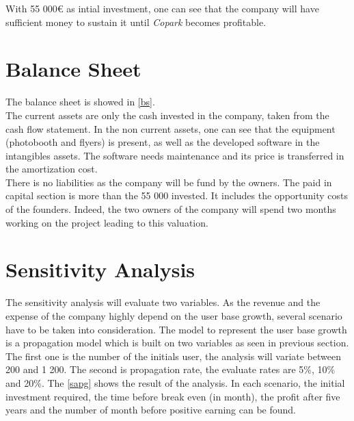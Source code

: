 \documentclass[12pt,a4paper,oneside]{book}
\newcommand{\bp}{\textit{Copark }}
\begin{document}
With 55 000\euro{} as intial investment, one can see that the company will have sufficient money to sustain it until \bp becomes profitable.

\section{Balance Sheet}
The balance sheet is showed in \autoref{bs}.\\

The current assets are only the cash invested in the company, taken from the cash flow statement. In the non current assets, one can see that the equipment (photobooth and flyers) is present, as well as the developed software in the intangibles assets. The software needs maintenance and its price is transferred in the amortization cost.\\

There is no liabilities as the company will be fund by the owners. The paid in capital section is more than the 55 000 invested. It includes the opportunity costs of the founders. Indeed, the two owners of the company will spend two months working on the project leading to this valuation.

\section{Sensitivity Analysis}

The sensitivity analysis will evaluate two variables. As the revenue and the expense of the company highly depend on the user base growth, several scenario have to be taken into consideration. The model to represent the user base growth is a propagation model which is built on two variables as seen in previous section. The first one is the number of the initials user, the analysis will variate between 200 and 1 200. The second is propagation rate, the evaluate rates are 5\%, 10\% and 20\%. The \autoref{sapg} shows the result of the analysis. In each scenario, the initial investment required, the time before break even (in month), the profit after five years and the number of month before positive earning can be found.\\
\end{document}

